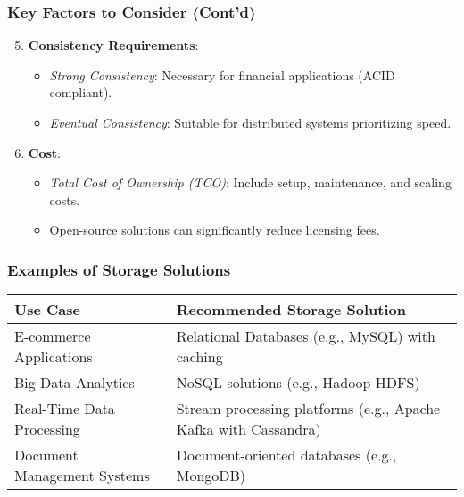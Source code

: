 \documentclass[aspectratio=169]{beamer}
\begin{document}
\begin{frame}[fragile]
    \frametitle{Key Factors to Consider (Cont'd)}
    \begin{enumerate}
        \setcounter{enumi}{4} %
        \item \textbf{Consistency Requirements}:
            \begin{itemize}
                \item \textit{Strong Consistency}: Necessary for financial applications (ACID compliant).
                \item \textit{Eventual Consistency}: Suitable for distributed systems prioritizing speed.
            \end{itemize}
        \item \textbf{Cost}:
            \begin{itemize}
                \item \textit{Total Cost of Ownership (TCO)}: Include setup, maintenance, and scaling costs.
                \item Open-source solutions can significantly reduce licensing fees.
            \end{itemize}
    \end{enumerate}
\end{frame}

\begin{frame}[fragile]
    \frametitle{Examples of Storage Solutions}
    \begin{table}[htbp]
        \begin{tabular}{|l|l|}
            \hline
            \textbf{Use Case} & \textbf{Recommended Storage Solution} \\
            \hline
            E-commerce Applications & Relational Databases (e.g., MySQL) with caching \\
            Big Data Analytics & NoSQL solutions (e.g., Hadoop HDFS) \\
            Real-Time Data Processing & Stream processing platforms (e.g., Apache Kafka with Cassandra) \\
            Document Management Systems & Document-oriented databases (e.g., MongoDB) \\
            \hline
        \end{tabular}
    \end{table}
\end{frame}
\end{document}
